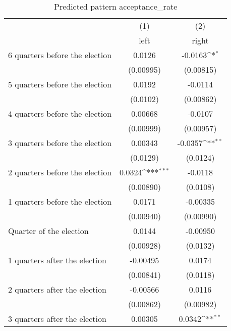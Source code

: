 \begin{table}[htbp]\centering
\def\sym#1{\ifmmode^{#1}\else\(^{#1}\)\fi}
\caption{Predicted pattern acceptance\_rate}
\begin{tabular}{l*{2}{c}}
\hline\hline
                    &\multicolumn{1}{c}{(1)}&\multicolumn{1}{c}{(2)}\\
                    &\multicolumn{1}{c}{left}&\multicolumn{1}{c}{right}\\
\hline
 6 quarters before the election&      0.0126         &     -0.0163\sym{*}  \\
                    &   (0.00995)         &   (0.00815)         \\
[1em]
 5 quarters before the election&      0.0192         &     -0.0114         \\
                    &    (0.0102)         &   (0.00862)         \\
[1em]
 4 quarters before the election&     0.00668         &     -0.0107         \\
                    &   (0.00999)         &   (0.00957)         \\
[1em]
 3 quarters before the election&     0.00343         &     -0.0357\sym{**} \\
                    &    (0.0129)         &    (0.0124)         \\
[1em]
 2 quarters before the election&      0.0324\sym{***}&     -0.0118         \\
                    &   (0.00890)         &    (0.0108)         \\
[1em]
 1 quarters before the election&      0.0171         &    -0.00335         \\
                    &   (0.00940)         &   (0.00990)         \\
[1em]
Quarter of the election&      0.0144         &    -0.00950         \\
                    &   (0.00928)         &    (0.0132)         \\
[1em]
 1 quarters after the election&    -0.00495         &      0.0174         \\
                    &   (0.00841)         &    (0.0118)         \\
[1em]
 2 quarters after the election&    -0.00566         &      0.0116         \\
                    &   (0.00862)         &   (0.00982)         \\
[1em]
 3 quarters after the election&     0.00305         &      0.0342\sym{**} \\

\end{tabular}
\end{table}
